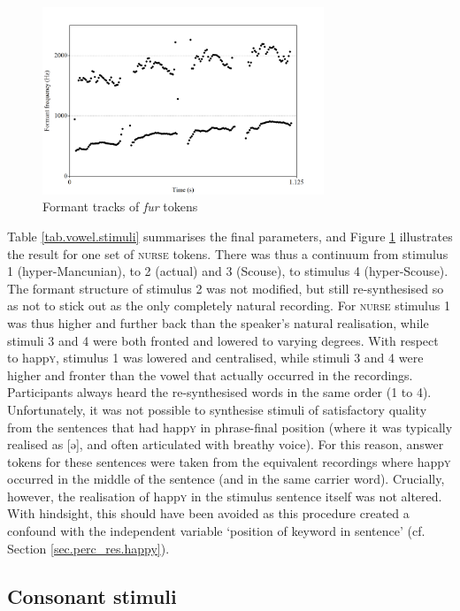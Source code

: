 \begin{figure}[h]
	\centering
	\includegraphics[width=0.75\textwidth]{./figures/fur_spectrogram.png}
	\caption{Formant tracks of \emph{fur} tokens}
	\label{fig.fur.spec}
\end{figure}

Table \ref{tab.vowel.stimuli} summarises the final parameters, and Figure \ref{fig.fur.spec} illustrates the result for one set of \textsc{nurse} tokens.
There was thus a continuum from stimulus 1 (hyper-Mancunian), to 2 (actual) and 3 (Scouse), to stimulus 4 (hyper-Scouse).
The formant structure of stimulus 2 was not modified, but still re-synthesised so as not to stick out as the only completely natural recording.
For \textsc{nurse} stimulus 1 was thus higher and further back than the speaker's natural realisation, while stimuli 3 and 4 were both fronted and lowered to varying degrees.
With respect to happ\textsc{y}, stimulus 1 was lowered and centralised, while stimuli 3 and 4 were higher and fronter than the vowel that actually occurred in the recordings.
Participants always heard the re-synthesised words in the same order (1 to 4).
Unfortunately, it was not possible to synthesise stimuli of satisfactory quality from the sentences that had happ\textsc{y} in phrase-final position (where it was typically realised as [ə], and often articulated with breathy voice).
For this reason, answer tokens for these sentences were taken from the equivalent recordings where happ\textsc{y} occurred in the middle of the sentence (and in the same carrier word).
Crucially, however, the realisation of happ\textsc{y} in the stimulus sentence itself was not altered.
With hindsight, this should have been avoided as this procedure created a confound with the independent variable `position of keyword in sentence' (cf. Section \ref{sec.perc_res.happy}).

\subsection{Consonant stimuli}\label{sec.perc_method.con}

